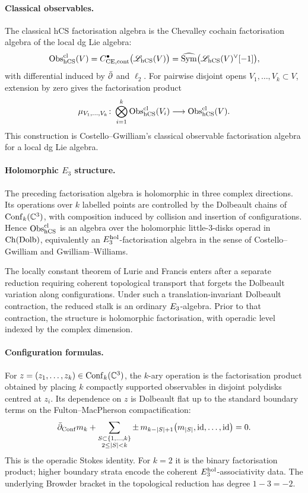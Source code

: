 \paragraph{Classical observables.}
The classical hCS factorisation algebra is the Chevalley cochain
factorisation algebra of the local dg Lie algebra:
\[
  \mathrm{Obs}^{\mathrm{cl}}_{\mathrm{hCS}}(V)
  =
  C^\bullet_{\mathrm{CE},\mathrm{cont}}\bigl(\mathscr L_{\mathrm{hCS}}(V)\bigr)
  =
  \widehat{\mathrm{Sym}}\bigl(\mathscr L_{\mathrm{hCS}}(V)^\vee[-1]\bigr),
\]
with differential induced by \(\bar\partial\) and \(\ell_2\). For pairwise
disjoint opens \(V_1,\ldots,V_k\subset V\), extension by zero gives the
factorisation product
\[
  \mu_{V_1,\ldots,V_k}\colon
  \bigotimes_{i=1}^k\mathrm{Obs}^{\mathrm{cl}}_{\mathrm{hCS}}(V_i)
  \longrightarrow
  \mathrm{Obs}^{\mathrm{cl}}_{\mathrm{hCS}}(V).
\]
This construction is Costello--Gwilliam's classical observable
factorisation algebra for a local dg Lie algebra.

\paragraph{Holomorphic \texorpdfstring{$E_3$}{E3} structure.}
The preceding factorisation algebra is holomorphic in three complex
directions. Its operations over \(k\) labelled points are controlled by
the Dolbeault chains of \(\mathrm{Conf}_k(\mathbb{C}^3)\), with composition induced by
collision and insertion of configurations. Hence
\(\mathrm{Obs}^{\mathrm{cl}}_{\mathrm{hCS}}\) is an algebra over the holomorphic
little-\(3\)-disks operad in \(\mathrm{Ch}(\mathrm{Dolb})\), equivalently an
\(E_3^{\mathrm{hol}}\)-factorisation algebra in the sense of
Costello--Gwilliam and Gwilliam--Williams.

The locally constant theorem of Lurie and Francis enters after a
separate reduction requiring coherent topological transport that forgets
the Dolbeault variation along configurations. Under such a
translation-invariant Dolbeault contraction, the reduced stalk is an
ordinary \(E_3\)-algebra. Prior to that contraction, the structure is
holomorphic factorisation, with operadic level indexed by the complex
dimension.

\paragraph{Configuration formulas.}
For \(z=(z_1,\ldots,z_k)\in\mathrm{Conf}_k(\mathbb{C}^3)\), the \(k\)-ary operation is
the factorisation product obtained by placing \(k\) compactly supported
observables in disjoint polydisks centred at \(z_i\). Its dependence on
\(z\) is Dolbeault flat up to the standard boundary terms on the
Fulton--MacPherson compactification:
\[
  \bar\partial_{\mathrm{Conf}} m_k
  +
  \sum_{\substack{S\subset\{1,\ldots,k\}\\2\leq |S|<k}}
  \pm\,
  m_{k-|S|+1}
  \bigl(m_{|S|},\mathrm{id},\ldots,\mathrm{id}\bigr)
  =0 .
\]
This is the operadic Stokes identity. For \(k=2\) it is the binary
factorisation product; higher boundary strata encode the coherent
\(E_3^{\mathrm{hol}}\)-associativity data. The underlying
Browder bracket in the topological reduction has degree \(1-3=-2\).

